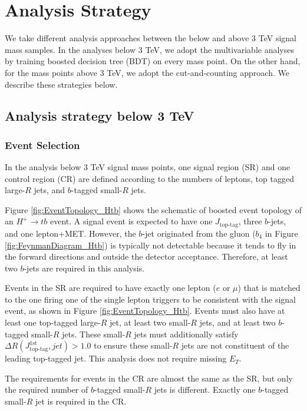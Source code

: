 \section{Analysis Strategy}
\label{sec:AnalysisStrategy}
We take different analysis approaches between the below and above 3 TeV signal mass samples. In the analyses below 3 TeV, we adopt the multivariable analyses by training boosted decision tree (BDT) on every mass point. On the other hand, for the mass points above 3 TeV, we adopt the cut-and-counting approach. We describe these strategies below.

\subsection{Analysis strategy below 3 TeV}
\label{subsec:AnaStrategyUnder3TeV}
\subsubsection{Event Selection}
\label{subsubsec:RegionDefUnder3TeV}
In the analysis below 3 TeV signal mass points, one signal region (SR) and one control region (CR) are defined according to the numbers of leptons, top tagged large-$R$ jets, and $b$-tagged small-$R$ jets. 

Figure \ref{fig:EventTopology_Htb} shows the schematic of boosted event topology of an $H^{+}{\rightarrow}tb$ event. A signal event is expected to have one $J_{\text{top-tag}}$, three $b$-jets, and one lepton+MET. However, the $b$-jet originated from the gluon ($b_{4}$ in Figure \ref{fig:FeynmanDiagram_Htb}) is typically not detectable because it tends to fly in the forward directions and outside the detector acceptance. Therefore, at least two $b$-jets are required in this analysis.

Events in the SR are required to have exactly one lepton ($e$ or ${\mu}$) that is matched to the one firing one of the single lepton triggers to be consistent with the signal event, as shown in Figure \ref{fig:EventTopology_Htb}. Events must also have at least one top-tagged large-$R$ jet, at least two small-$R$ jets, and at least two $b$-tagged small-$R$ jets. These small-$R$ jets must additionally satisfy ${\Delta}R(J_{\text{top-tag}}^{1\text{st}}, jet)>1.0$ to ensure these small-$R$ jets are not constituent of the leading top-tagged jet. This analysis does not require missing $E_{T}$. 

The requirements for events in the CR are almost the same as the SR, but only the required number of $b$-tagged small-$R$ jets is different. Exactly one $b$-tagged small-$R$ jet is required in the CR.

